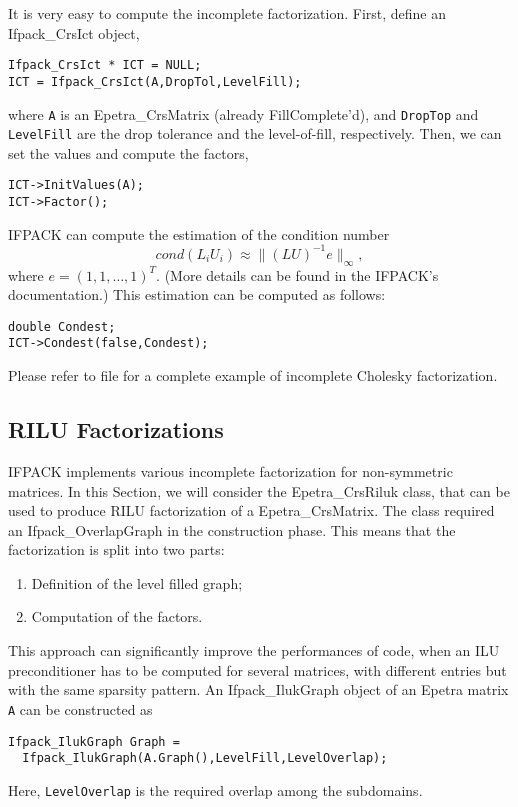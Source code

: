 It is very easy to compute the incomplete factorization. First, define
an Ifpack\_CrsIct object,
\begin{verbatim}
Ifpack_CrsIct * ICT = NULL;
ICT = Ifpack_CrsIct(A,DropTol,LevelFill);
\end{verbatim}
where \verb!A! is an Epetra\_CrsMatrix (already FillComplete'd), and
\verb!DropTop! and \verb!LevelFill! are the drop tolerance and the
level-of-fill, respectively. Then, we can set the values and compute the
factors,
\begin{verbatim}
ICT->InitValues(A);
ICT->Factor();
\end{verbatim}

IFPACK can compute the estimation of the condition number
\[
cond(L_i U_i) \approx \|(LU)^{-1} e \|_\infty ,
\]
where $e = (1,1,\dots,1)^T$. (More details can be found in the IFPACK's
documentation.) This estimation can be computed as follows:
\begin{verbatim}
double Condest;
ICT->Condest(false,Condest);
\end{verbatim}
Please refer to file  for a complete example of
incomplete Cholesky factorization.


\subsection{RILU  Factorizations}
\label{sec:ifpack_rilu}

IFPACK implements various incomplete factorization for non-symmetric
matrices. In this Section, we will consider the Epetra\_CrsRiluk class,
that can be used to produce RILU factorization of a Epetra\_CrsMatrix.
The class required an Ifpack\_OverlapGraph in the construction phase.
This means that the factorization is split into two parts:
\begin{enumerate}
\item Definition of the level filled graph;
\item Computation of the factors.
\end{enumerate}
This approach can significantly improve the performances of code, when
an ILU preconditioner has to be computed for several matrices, with
different entries but with the same sparsity pattern. An
Ifpack\_IlukGraph object of an Epetra matrix \verb!A! can be constructed
as
\begin{verbatim}
Ifpack_IlukGraph Graph = 
  Ifpack_IlukGraph(A.Graph(),LevelFill,LevelOverlap);
\end{verbatim}
Here, \verb!LevelOverlap! is the required overlap among the subdomains.

